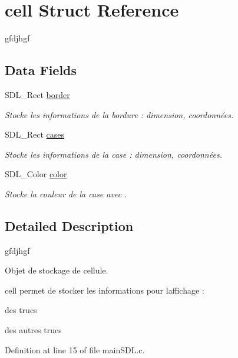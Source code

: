 \hypertarget{structcell}{}\section{cell Struct Reference}
\label{structcell}


gfdjhgf  


\subsection*{Data Fields}
\begin{DoxyCompactItemize}
\item 
S\+D\+L\+\_\+\+Rect \hyperlink{structcell_ae289d5dfc43a03b47de6dffa417776df}{border}
\begin{DoxyCompactList}\small\item\em Stocke les informations de la bordure \+: dimension, coordonnées. \end{DoxyCompactList}\item 
S\+D\+L\+\_\+\+Rect \hyperlink{structcell_af2fb9745b37f309905e02fed903748a5}{cases}
\begin{DoxyCompactList}\small\item\em Stocke les informations de la case \+: dimension, coordonnées. \end{DoxyCompactList}\item 
S\+D\+L\+\_\+\+Color \hyperlink{structcell_a17634ccb0012ada2dc1f042314d35c21}{color}
\begin{DoxyCompactList}\small\item\em Stocke la couleur de la case avec . \end{DoxyCompactList}\end{DoxyCompactItemize}


\subsection{Detailed Description}
gfdjhgf 

Objet de stockage de cellule.

cell permet de stocker les informations pour l\textquotesingle{}affichage \+:
\begin{DoxyItemize}
\item des trucs
\item des autres trucs 
\end{DoxyItemize}

Definition at line 15 of file main\+S\+D\+L.\+c.



